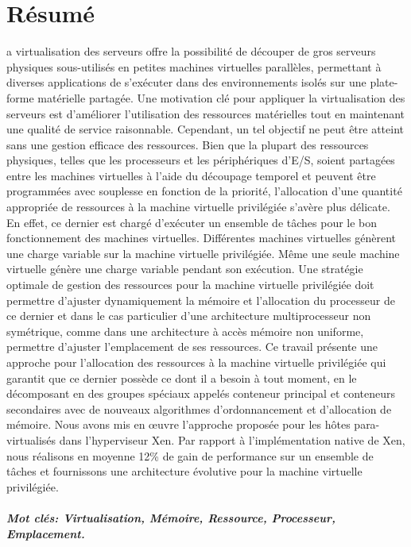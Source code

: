 %
%
%

\chapter*{R\'{e}sum\'{e}}
a virtualisation des serveurs offre la possibilit\'{e} de d\'{e}couper de gros serveurs physiques sous-utilis\'{e}s en petites machines virtuelles parall\`{e}les, permettant \`{a} diverses applications de s'ex\'{e}cuter dans des environnements isol\'{e}s sur une plate-forme mat\'{e}rielle partag\'{e}e. Une motivation cl\'{e} pour appliquer la virtualisation des serveurs est d'am\'{e}liorer  l'utilisation des ressources mat\'{e}rielles tout en maintenant une qualit\'{e} de service raisonnable. Cependant, un tel objectif ne peut \^{e}tre atteint sans une gestion efficace des ressources. Bien que la plupart des ressources physiques, telles que les processeurs et les p\'{e}riph\'{e}riques d'E/S, soient partag\'{e}es entre les machines virtuelles \`{a} l'aide du d\'{e}coupage temporel et peuvent \^{e}tre programm\'{e}es avec souplesse en fonction de la priorit\'{e}, l'allocation d'une quantit\'{e} appropri\'{e}e de ressources \`{a} la machine virtuelle privil\'{e}gi\'{e}e s'av\`{e}re plus d\'{e}licate. En effet, ce dernier est charg\'{e} d'ex\'{e}cuter un ensemble de t\^{a}ches pour le bon fonctionnement des machines virtuelles. Diff\'{e}rentes machines virtuelles g\'{e}n\`{e}rent une charge variable sur la machine virtuelle privil\'{e}gi\'{e}e. M\^{e}me une seule machine virtuelle g\'{e}n\`{e}re une charge variable pendant son ex\'{e}cution. Une strat\'{e}gie optimale de gestion des ressources pour la machine virtuelle privil\'{e}gi\'{e}e doit permettre d'ajuster dynamiquement la m\'{e}moire et l'allocation du processeur de ce dernier et dans le cas particulier d'une architecture multiprocesseur non sym\'{e}trique, comme dans une architecture \`{a} acc\`{e}s  m\'{e}moire non uniforme, permettre d'ajuster l'emplacement de ses ressources. Ce travail pr\'{e}sente une approche pour l'allocation des ressources \`{a} la machine virtuelle privil\'{e}gi\'{e}e qui garantit que ce dernier poss\`{e}de ce dont il a besoin \`{a} tout moment, en le d\'{e}composant en des groupes sp\'{e}ciaux appel\'{e}s conteneur principal et conteneurs secondaires avec de nouveaux algorithmes d'ordonnancement et d'allocation de m\'{e}moire. Nous avons mis en \oe{}uvre l'approche propos\'{e}e pour les h\^{o}tes para-virtualis\'{e}s dans l'hyperviseur Xen. Par rapport \`{a} l'impl\'{e}mentation native de Xen, nous r\'{e}alisons en moyenne 12\% de gain de performance sur un ensemble de t\^{a}ches et fournissons une architecture \'{e}volutive pour la machine virtuelle privil\'{e}gi\'{e}e.

\paragraph{Mot cl\'{e}s: Virtualisation, M\'{e}moire, Ressource, Processeur, Emplacement.}

\clearpage